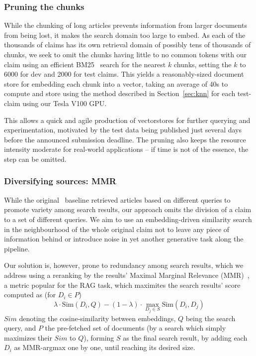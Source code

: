 \subsubsection{Pruning the chunks}
While the chunking of long articles prevents information from larger documents from being lost, it makes the search domain too large to embed.
As each of the thousands of claims has its own retrieval domain of possibly tens of thousands of chunks, we seek to omit the chunks having little to no common tokens with our claim using an efficient BM25~\cite{bm25} search for the nearest $k$ chunks, setting the $k$ to 6000 for dev and 2000 for test claims. 
This yields a reasonably-sized document store for embedding each chunk into a vector, taking an average of 40s to compute and store using the method described in Section~\ref{sec:knn} for each test-claim using our Tesla V100 GPU.

This allows a quick and agile production of vectorstores for further querying and experimentation, motivated by the \averitec{}  test data being published just several days before the announced submission deadline.
The pruning also keeps the resource intensity moderate for real-world applications -- if time is not of the essence, the step can be omitted.

\subsubsection{Diversifying sources: MMR}
While the original~\cite{averitec2024} baseline retrieved articles based on different queries to promote variety among search results, our approach omits the division of a claim to a set of different queries.
We aim to use an embedding-driven similarity search in the neighbourhood of the whole original claim not to leave any piece of information behind or introduce noise in yet another generative task along the pipeline.

Our solution is, however, prone to redundancy among search results, which we address using a reranking by the results' Maximal Marginal Relevance (MMR)~\cite{carbonell-mmr}, a metric popular for the RAG task, which maximites the search results' score computed as (for $D_i\in P$)
$$\lambda \cdot \mathrm{Sim}(D_i, Q) - (1-\lambda) \cdot \max_{D_j \in S} \mathrm{Sim}(D_i, D_j)$$
$Sim$ denoting the cosine-similarity between embeddings, $Q$ being the search query, and $P$ the pre-fetched set of documents (by a search which simply maximizes their $Sim$ to $Q$), forming $S$ as the final search result, by adding each $D_i$ as MMR-argmax one by one, until reaching its desired size.

